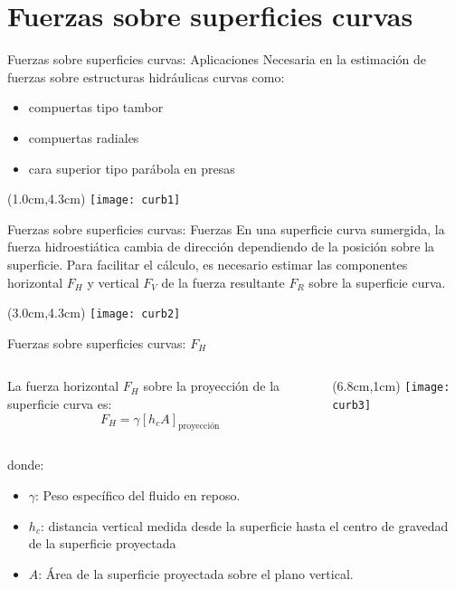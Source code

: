 \documentclass [xcolor=svgnames, t] {beamer}
\begin{document}
\section{Fuerzas sobre superficies curvas}
\begin{frame}{Fuerzas sobre superficies curvas: Aplicaciones}
Necesaria en la estimaci\'on de fuerzas sobre estructuras hidr\'aulicas curvas como:
\begin{itemize}
\item compuertas tipo tambor
\item compuertas radiales
\item cara superior tipo par\'abola en presas
\end{itemize}
\begin{textblock*}{10.5cm}(1.0cm,4.3cm) %
\texttt{[image: curb1]}
\end{textblock*}
\end{frame} 

\begin{frame}{Fuerzas sobre superficies curvas: Fuerzas}
En una superficie curva sumergida, la fuerza hidroesti\'atica cambia de direcci\'on dependiendo de la posici\'on sobre la superficie. Para facilitar el c\'alculo, es necesario estimar las componentes horizontal $F_H$ y vertical $F_V$ de  la fuerza resultante $F_R$ sobre la superficie curva. 
\begin{textblock*}{6.5cm}(3.0cm,4.3cm) %
\texttt{[image: curb2]}
\end{textblock*}
\end{frame}

\begin{frame}{Fuerzas sobre superficies curvas: $F_H$}
\begin{columns}
La fuerza horizontal $F_H$ sobre la proyecci\'on de la superficie curva es:
$$
F_H=\gamma[h_c A]_{\text{proyecci\'on}} 
$$
\begin{textblock*}{6cm}(6.8cm,1cm) %
\texttt{[image: curb3]}
\end{textblock*}
\end{columns}
\vspace{1.5cm}
donde:
\begin{itemize} 
\item $\gamma$: Peso espec\'ifico del fluido en reposo.
\item $h_c$: distancia vertical medida desde la superficie hasta el centro de gravedad de la superficie proyectada
\item $A$: \'Area de la superficie proyectada sobre el plano vertical.
\end{itemize}
\end{frame}
\end{document}
